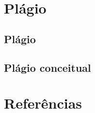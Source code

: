 \documentclass{beamer}
\begin{document}
\section{Plágio}

\subsection{Plágio}

\subsection{Plágio conceitual}


\section{Referências}
\end{document}

